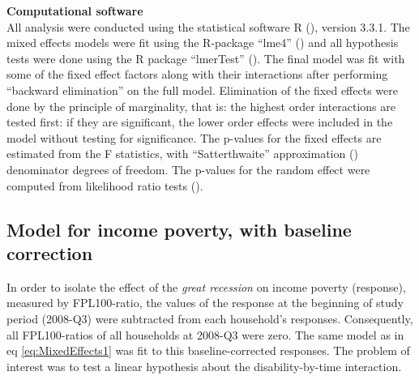 \documentclass[11pt]{extarticle} %
\begin{document}
\noindent
{\bf{Computational software}}\\
All analysis were conducted using the statistical software R (\cite{R}), version 3.3.1. The mixed effects models were fit using the R-package ``lme4'' (\cite{R-lme4}) and all hypothesis tests were done using the R package ``lmerTest'' (\cite{Kuznetsova_etal_2015_R-lmerTest}). The final model was fit with some of the fixed effect factors along with their interactions after performing ``backward elimination'' on the full model. Elimination of the fixed effects were done by the principle of marginality, that is: the highest order interactions are tested first: if they are significant, the lower order effects were included in the model without testing for significance. The p-values for the fixed effects are estimated from the F statistics, with ``Satterthwaite'' approximation (\cite{Satterthwaite_1946_Biometrics}) denominator degrees of freedom. The p-values for the random effect were computed from likelihood ratio tests (\cite{Morrell_1998_Biometrics}). 

\subsection{Model for income poverty, with baseline correction} \label{baselineCorrection}
In order to isolate the effect of the {\emph{great recession}} on income poverty (response), measured by FPL100-ratio, the values of the response at the beginning of study period (2008-Q3) were subtracted from each household's responses. Consequently, all FPL100-ratios of all households at 2008-Q3 were zero. The same model as in eq \ref{eq:MixedEffects1} was fit to this baseline-corrected responses. The problem of interest was to test a linear hypothesis about the disability-by-time interaction. 
\end{document}
